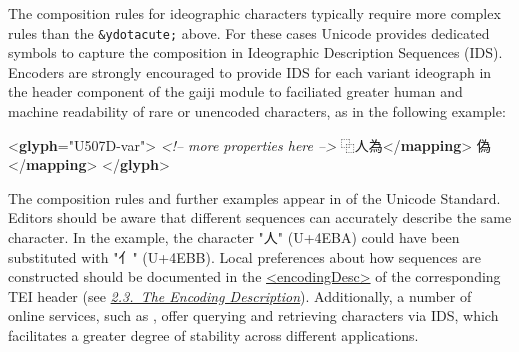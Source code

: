 The composition rules for ideographic characters typically require more complex rules than the \texttt{\&ydotacute;} above. For these cases Unicode provides dedicated symbols to capture the composition in Ideographic Description Sequences (IDS). Encoders are strongly encouraged to provide IDS for each variant ideograph in the header component of the gaiji module to faciliated greater human and machine readability of rare or unencoded characters, as in the following example: \par\bgroup{}\exampleFont \begin{shaded}\noindent\mbox{}{<\textbf{glyph}\hspace*{1em}{xml:id}="{U507D-var}">}\mbox{}\newline 
\textit{<!-- more properties here -->}\mbox{}\newline 
{}⿻人為{</\textbf{mapping}>}\mbox{}\newline 
{}偽{</\textbf{mapping}>}\mbox{}\newline 
{</\textbf{glyph}>}\end{shaded}\egroup\par \noindent  The composition rules and further examples appear in  of the Unicode Standard. Editors should be aware that different sequences can accurately describe the same character. In the example, the character "人" (U+4EBA) could have been substituted with "亻" (U+4EBB). Local preferences about how sequences are constructed should be documented in the \hyperref[TEI.encodingDesc]{<encodingDesc>} of the corresponding TEI header (see \textit{\hyperref[HD5]{2.3.\ The Encoding Description}}). Additionally, a number of online services, such as , offer querying and retrieving characters via IDS, which facilitates a greater degree of stability across different applications.\par
